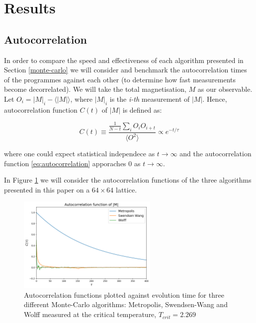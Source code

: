 \section{Results}

\subsection{Autocorrelation}
\label{sec:auto}

In order to compare the speed and effectiveness of each algorithm presented in Section \ref{monte-carlo} we will consider and benchmark the autocorrelation times of the programmes against each other (to determine how fast measurements become decorrelated). We will take the total magnetisation, $M$ as our observable. Let $O_{i} = |M|_{i} - \langle |M| \rangle$, where $|M|_{i}$ is the \textit{i-th} measurement of $|M|$. Hence, autocorrelation function $C(t)$ of $|M|$ is defined as:

\begin{equation}
	\label{eq:autocorrelation}
	C(t) \equiv \frac{\frac{1}{N-t} \sum_{i} O_{i}O_{i+t}}{\langle O^2 \rangle} \propto e^{-t/\tau}
\end{equation}

where one could expect statistical independece as $t \to \infty$ and the autocorrelation function \ref{eq:autocorrelation} apporaches $0$ as $t \to \infty$. 

In Figure \ref{fig:autocorrelation} we will consider the autocorrelation functions of the three algorithms presented in this paper on a $64 \times 64$ lattice. 

\begin{figure}[h!]

  \includegraphics[width=0.6\textwidth]{figures/autocorrelation.png}
  \centering
  \caption{Autocorrelation functions plotted against evolution time for three different Monte-Carlo algorithms: Metropolis, Swendsen-Wang and Wolff measured at the critical temperature, $T_{crit} = 2.269$}
   \label{fig:autocorrelation}
\end{figure}

